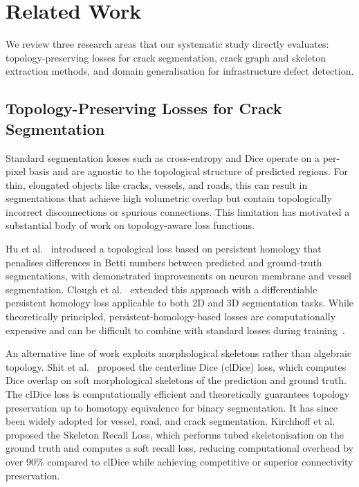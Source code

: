\section{Related Work}
\label{sec:related_work}

We review three research areas that our systematic study directly evaluates: topology-preserving losses for crack segmentation, crack graph and skeleton extraction methods, and domain generalisation for infrastructure defect detection.

\subsection{Topology-Preserving Losses for Crack Segmentation}
\label{sec:rw_topology}

Standard segmentation losses such as cross-entropy and Dice operate on a per-pixel basis and are agnostic to the topological structure of predicted regions. For thin, elongated objects like cracks, vessels, and roads, this can result in segmentations that achieve high volumetric overlap but contain topologically incorrect disconnections or spurious connections. This limitation has motivated a substantial body of work on topology-aware loss functions.

Hu et al.~\cite{hu2019topology} introduced a topological loss based on persistent homology that penalises differences in Betti numbers between predicted and ground-truth segmentations, with demonstrated improvements on neuron membrane and vessel segmentation. Clough et al.~\cite{clough2020topological} extended this approach with a differentiable persistent homology loss applicable to both 2D and 3D segmentation tasks. While theoretically principled, persistent-homology-based losses are computationally expensive and can be difficult to combine with standard losses during training~\cite{hu2021topology}.

An alternative line of work exploits morphological skeletons rather than algebraic topology. Shit et al.~\cite{shit2021cldice} proposed the centerline Dice (clDice) loss, which computes Dice overlap on soft morphological skeletons of the prediction and ground truth. The clDice loss is computationally efficient and theoretically guarantees topology preservation up to homotopy equivalence for binary segmentation. It has since been widely adopted for vessel, road, and crack segmentation. Kirchhoff et al.~\cite{kirchhoff2024skeleton} proposed the Skeleton Recall Loss, which performs tubed skeletonisation on the ground truth and computes a soft recall loss, reducing computational overhead by over 90\% compared to clDice while achieving competitive or superior connectivity preservation.

